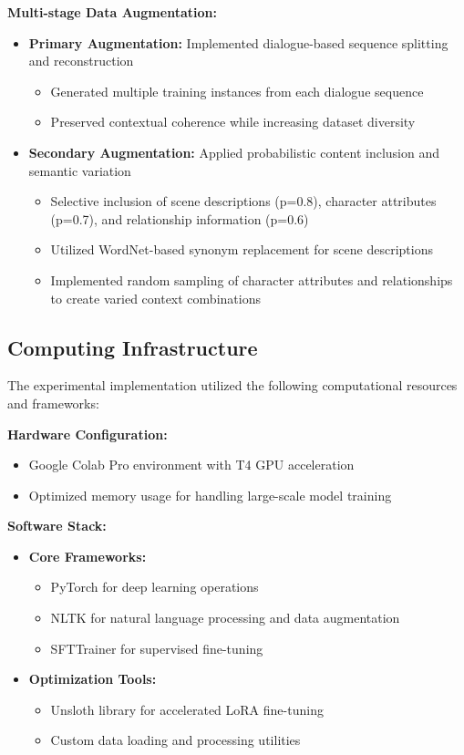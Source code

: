 \documentclass{article}
\begin{document}
\textbf{Multi-stage Data Augmentation:}
\begin{itemize}
\item \textbf{Primary Augmentation:} Implemented dialogue-based sequence splitting and reconstruction
    \begin{itemize}
    \item Generated multiple training instances from each dialogue sequence
    \item Preserved contextual coherence while increasing dataset diversity
    \end{itemize}
\item \textbf{Secondary Augmentation:} Applied probabilistic content inclusion and semantic variation
    \begin{itemize}
    \item Selective inclusion of scene descriptions (p=0.8), character attributes (p=0.7), and relationship information (p=0.6)
    \item Utilized WordNet-based synonym replacement for scene descriptions
    \item Implemented random sampling of character attributes and relationships to create varied context combinations
    \end{itemize}
\end{itemize}

\subsection{Computing Infrastructure}
The experimental implementation utilized the following computational resources and frameworks:

\textbf{Hardware Configuration:}
\begin{itemize}
\item Google Colab Pro environment with T4 GPU acceleration
\item Optimized memory usage for handling large-scale model training
\end{itemize}

\textbf{Software Stack:}
\begin{itemize}
\item \textbf{Core Frameworks:}
    \begin{itemize}
    \item PyTorch for deep learning operations
    \item NLTK for natural language processing and data augmentation
    \item SFTTrainer for supervised fine-tuning
    \end{itemize}
\item \textbf{Optimization Tools:}
    \begin{itemize}
    \item Unsloth library for accelerated LoRA fine-tuning
    \item Custom data loading and processing utilities
    \end{itemize}
\end{itemize}
\end{document}
